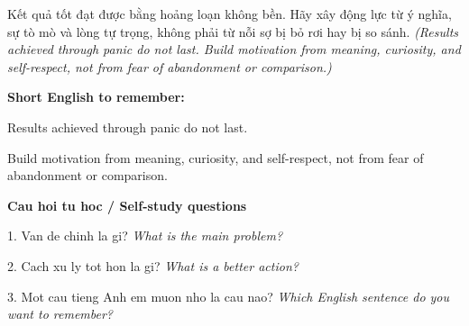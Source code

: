 \begin{baihoc}
Kết quả tốt đạt được bằng hoảng loạn không bền. Hãy xây động lực từ ý nghĩa, sự tò mò và lòng tự trọng, không phải từ nỗi sợ bị bỏ rơi hay bị so sánh.
\textit{(Results achieved through panic do not last. Build motivation from meaning, curiosity, and self-respect, not from fear of abandonment or comparison.)}
\end{baihoc}

\begin{ghinhoanh}
\textbf{Short English to remember:}

Results achieved through panic do not last.

Build motivation from meaning, curiosity, and self-respect, not from fear of abandonment or comparison.

\end{ghinhoanh}

\begin{tuhocnhanh}
\textbf{Cau hoi tu hoc / Self-study questions}

1. Van de chinh la gi? \textit{What is the main problem?}

2. Cach xu ly tot hon la gi? \textit{What is a better action?}

3. Mot cau tieng Anh em muon nho la cau nao? \textit{Which English sentence do you want to remember?}
\end{tuhocnhanh}
\ngancach

